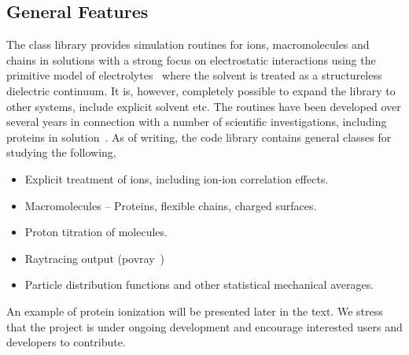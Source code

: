 \documentclass[10pt]{bmc_article}
\newenvironment{bmcformat}{\fussy\setboolean{publ}{true}}{\fussy}
\begin{document}
\begin{bmcformat}
\subsection*{General Features}
The class library provides simulation routines for ions, macromolecules and chains in solutions with a strong focus on electrostatic interactions using the primitive model of electrolytes~\cite{hill:86} where the solvent is treated as a structureless dielectric continuum. It is, however, completely possible to expand the library to other systems, include explicit solvent etc. The routines have been developed over several years in connection with a number of scientific investigations, including proteins in solution~\cite{lund:05}.
As of writing, the code library contains general classes for studying the following,
\begin{itemize}
\item Explicit treatment of ions, including ion-ion correlation effects.
\item Macromolecules -- Proteins, flexible chains, charged surfaces.
\item Proton titration of molecules.
\item Raytracing output (povray~\cite{povray})
\item Particle distribution functions and other statistical mechanical averages.
\end{itemize}
An example of protein ionization will be presented later in the text.
We stress that the project is under ongoing development and encourage interested users and developers to contribute.





\end{bmcformat}
\end{document}
